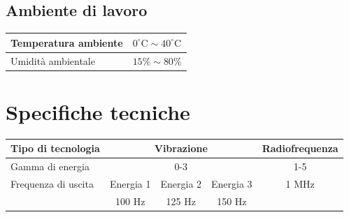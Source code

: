 \documentclass[a4paper]{article}
\begin{document}
\subsection{Ambiente di lavoro}

\begin{table}[H]
\centering
\begin{tabular}{|l|l|}
\hline
Temperatura ambiente & $0^{\circ} \mathrm{C} \sim 40^{\circ} \mathrm{C}$ \\
\hline
Umidità ambientale & $15 \% \sim 80 \%$ \\
\hline
\end{tabular}
\end{table}



\section{Specifiche tecniche}

\begin{tabular}{|l|ccc|c|}
	\hline
	Tipo di tecnologia & \multicolumn{3}{c|}{Vibrazione} & Radiofrequenza \\
	\hline
	Gamma di energia   & \multicolumn{3}{c|}{0-3}      & 1-5 \\
	\hline
	Frequenza di uscita & Energia 1 & Energia 2 & Energia 3 & 1 MHz \\
	\hline
	& 100 Hz    & 125 Hz    & 150 Hz    &      \\
	\hline
\end{tabular}
\end{document}
